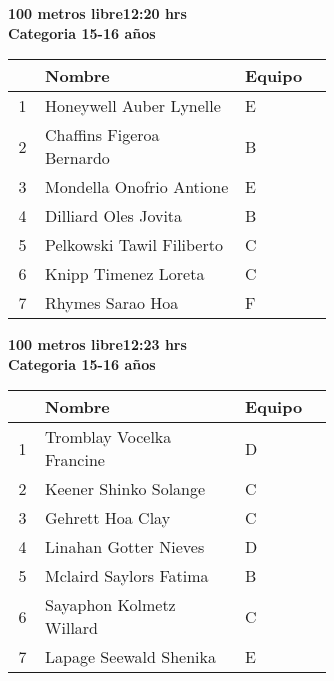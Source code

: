 \begin{minipage}{0.95\linewidth}\vspace{0.5cm} 
\begin{flushleft}
\textbf{
\hspace{-0.15cm}100 metros libre\hspace{1.5cm}12:20 hrs \\Categoria 15-16 años}\vspace{-0.2cm} 
\end{flushleft}
\begin{tabular}{cp{0.63\linewidth}l}
\hline
& \textbf{Nombre} & \textbf{Equipo} \\ \hline
1 & Honeywell Auber Lynelle & E \\ 
2 & Chaffins Figeroa Bernardo & B \\ 
3 & Mondella Onofrio Antione & E \\ 
4 & Dilliard Oles Jovita & B \\ 
5 & Pelkowski Tawil Filiberto & C \\ 
6 & Knipp Timenez Loreta & C \\ 
7 & Rhymes Sarao Hoa & F \\ 
\end{tabular}
\end{minipage}
\begin{minipage}{0.95\linewidth}\vspace{0.5cm} 
\begin{flushleft}
\textbf{
\hspace{-0.15cm}100 metros libre\hspace{1.5cm}12:23 hrs \\Categoria 15-16 años}\vspace{-0.2cm} 
\end{flushleft}
\begin{tabular}{cp{0.63\linewidth}l}
\hline
& \textbf{Nombre} & \textbf{Equipo} \\ \hline
1 & Tromblay Vocelka Francine & D \\ 
2 & Keener Shinko Solange & C \\ 
3 & Gehrett Hoa Clay & C \\ 
4 & Linahan Gotter Nieves & D \\ 
5 & Mclaird Saylors Fatima & B \\ 
6 & Sayaphon Kolmetz Willard & C \\ 
7 & Lapage Seewald Shenika & E \\ 
\end{tabular}
\end{minipage}
